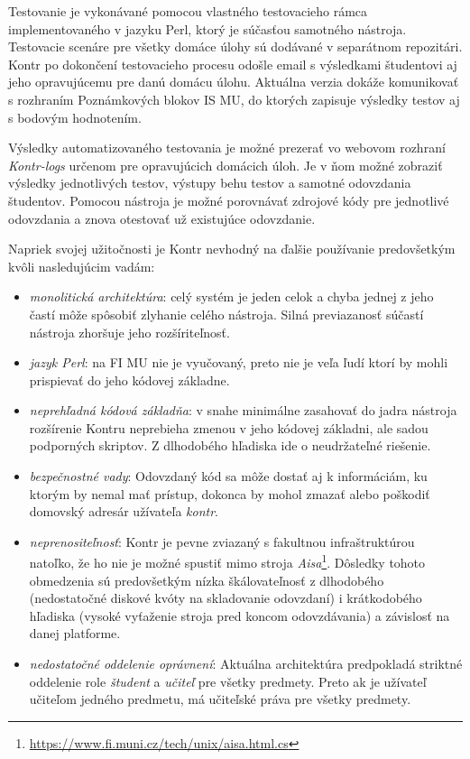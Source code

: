 \documentclass[
  digital, %
  oneside, %
  table,   %
  lof,     %
  lot,   %
]{fithesis3}
\begin{document}
Testovanie je vykonávané pomocou vlastného testovacieho rámca implementovaného v jazyku Perl, ktorý je súčasťou samotného nástroja. Testovacie scenáre pre všetky domáce úlohy sú dodávané v separátnom repozitári. Kontr po dokončení testovacieho procesu odošle email s výsledkami študentovi aj jeho opravujúcemu pre danú domácu úlohu. Aktuálna verzia dokáže komunikovať s rozhraním Poznámkových blokov IS MU, do ktorých zapisuje výsledky testov aj s bodovým hodnotením.

Výsledky automatizovaného testovania je možné prezerať vo webovom rozhraní \textit{Kontr-logs} určenom pre opravujúcich domácich úloh. Je v ňom možné zobraziť výsledky jednotlivých testov, výstupy behu testov a samotné odovzdania študentov. Pomocou nástroja je možné porovnávať zdrojové kódy pre jednotlivé odovzdania a znova otestovať už existujúce odovzdanie. 

Napriek svojej užitočnosti je Kontr nevhodný na ďalšie používanie predovšetkým kvôli nasledujúcim vadám:
\begin{itemize}
    \item \emph{monolitická architektúra}: celý systém je jeden celok a chyba jednej z jeho častí môže spôsobiť zlyhanie celého nástroja. Silná previazanosť súčastí nástroja zhoršuje jeho rozšíriteľnosť.
    \item \emph{jazyk Perl}: na FI MU nie je vyučovaný, preto nie je veľa ľudí ktorí by mohli prispievať do jeho kódovej základne.
    \item \emph{neprehľadná kódová základňa}: v snahe minimálne zasahovať do jadra nástroja rozšírenie Kontru neprebieha zmenou v jeho kódovej základni, ale sadou podporných skriptov. Z dlhodobého hľadiska ide o neudržateľné riešenie.
    \item\emph{bezpečnostné vady}: Odovzdaný kód sa môže dostať aj k informáciám, ku ktorým by nemal mať prístup, dokonca by mohol zmazať alebo poškodiť domovský adresár užívateľa \textit{kontr}.
    \item \emph{neprenositeľnosť}: Kontr je pevne zviazaný s fakultnou infraštruktúrou natoľko, že ho nie je možné spustiť mimo stroja \textit{Aisa}\footnote{\url{https://www.fi.muni.cz/tech/unix/aisa.html.cs}}. Dôsledky tohoto obmedzenia sú predovšetkým nízka škálovateľnosť z dlhodobého (nedostatočné diskové kvóty na skladovanie odovzdaní) i krátkodobého hľadiska (vysoké vyťaženie stroja pred koncom odovzdávania) a závislosť na danej platforme.
    \item \emph{nedostatočné oddelenie oprávnení}: Aktuálna architektúra predpokladá striktné oddelenie role \emph{študent} a \emph{učiteľ} pre všetky predmety. Preto ak je užívateľ učiteľom jedného predmetu, má učiteľské práva pre všetky predmety.
\end{itemize}
\end{document}
